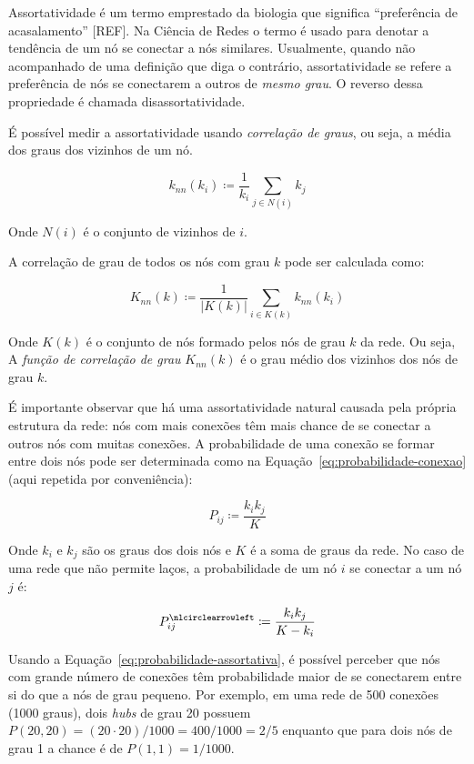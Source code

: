 \documentclass[12pt,a4paper]{article}
\theoremstyle{hypo}
\newcommand{\defn}{\coloneqq} %
\newcommand{\noloop}[1]{#1^\nlcirclearrowleft} %
\begin{document}
Assortatividade é um termo emprestado da biologia que significa \enquote{preferência de acasalamento} [REF]. Na Ciência de Redes o termo é usado para denotar a tendência de um nó se conectar a nós similares. Usualmente, quando não acompanhado de uma definição que diga o contrário, assortatividade se refere a preferência de nós se conectarem a outros de \textit{mesmo grau}. O reverso dessa propriedade é chamada disassortatividade.

É possível medir a assortatividade usando \textit{correlação de graus}, ou seja, a média dos graus dos vizinhos de um nó.

\begin{equation}
k_\textit{nn}(k_i) \defn \frac{1}{k_i} \sum_{j \in N(i)} k_j
\end{equation}

Onde $N(i)$ é o conjunto de vizinhos de $i$.

A correlação de grau de todos os nós com grau $k$ pode ser calculada como:

\begin{equation}
K_\textit{nn}(k) \defn \frac{1}{|K(k)|} \sum_{i \in K(k)} k_\textit{nn}(k_i)
\end{equation}

Onde $K(k)$ é o conjunto de nós formado pelos nós de grau $k$ da rede. Ou seja, A \textit{função de correlação de grau} $K_\textit{nn}(k)$ é o grau médio dos vizinhos dos nós de grau $k$.

É importante observar que há uma assortatividade natural causada pela própria estrutura da rede: nós com mais conexões têm mais chance de se conectar a outros nós com muitas conexões. A probabilidade de uma conexão se formar entre dois nós pode ser determinada como na Equação~\ref{eq:probabilidade-conexao} (aqui repetida por conveniência):

\begin{equation} \label{eq:probabilidade-assortativa}
P_{ij} \defn \frac{k_i k_j}{K}
\end{equation}

Onde $k_i$ e $k_j$ são os graus dos dois nós e $K$ é a soma de graus da rede. No caso de uma rede que não permite laços, a probabilidade de um nó $i$ se conectar a um nó $j$ é:~

\begin{equation}
\noloop{P}_{ij} \defn \frac{k_i k_j}{K - k_i}
\end{equation}

Usando a Equação~\ref{eq:probabilidade-assortativa}, é possível perceber que nós com grande número de conexões têm probabilidade maior de se conectarem entre si do que a nós de grau pequeno. Por exemplo, em uma rede de 500 conexões (1000 graus), dois \textit{hubs} de grau 20 possuem $P(20, 20) = (20 \cdot 20) / 1000 = 400 / 1000 = 2 / 5$ enquanto que para dois nós de grau 1 a chance é de $P(1, 1) = 1 / 1000$.
\end{document}
